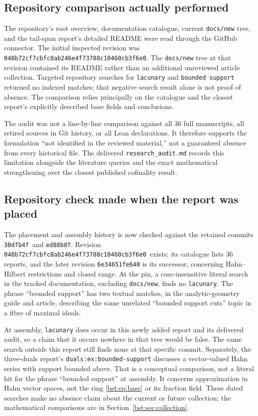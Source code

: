 \documentclass[11pt,letterpaper]{article}
\theoremstyle{definition}
\theoremstyle{remark}
\newcommand{\auditcommit}{\texttt{048b72cf7cbfc8ab246e4f73788c10460cb3f6e0}}
\newcommand{\placecommit}{\texttt{30dfb4f}}
\newcommand{\assemblycommit}{\texttt{ed88b8f}}
\begin{document}
\subsection{Repository comparison actually performed}

The repository's root overview, documentation catalogue, current
\texttt{docs/new} tree, and the tail-span report's detailed README were
read through the GitHub connector. The initial inspected revision was
\auditcommit. The \texttt{docs/new} tree at that revision contained its
README rather than an additional unreviewed article collection. Targeted
repository searches for \texttt{lacunary} and \texttt{bounded support}
returned no indexed matches; that negative search result alone is not
proof of absence. The comparison relies principally on the catalogue and
the closest report's explicitly described base fields and conclusions.

The audit was not a line-by-line comparison against all 36 full manuscripts,
all retired sources in Git history, or all Lean declarations. It therefore
supports the formulation ``not identified in the reviewed material,'' not
a guaranteed absence from every historical file. The delivered
\texttt{research\_audit.md} records this limitation alongside the literature
queries and the exact mathematical strengthening over the closest published
cofinality result.

\subsection{Repository check made when the report was placed}

The placement and assembly history is now checked against the retained
commits \placecommit\ and \assemblycommit. Revision \auditcommit\ exists;
its catalogue lists 36 reports, and the later revision
\texttt{6e34651fe640} is its successor, concerning Hahn--Hilbert restrictions
and closed range. At the pin, a case-insensitive literal search in the
tracked documentation, excluding \texttt{docs/new}, finds no
\texttt{lacunary}. The phrase ``bounded support'' has two textual matches,
in the analytic-geometry guide and article, describing the same unrelated
``bounded support cuts'' topic in a fibre of maximal ideals.

At assembly, \texttt{lacunary} does occur in this newly added report and
its delivered audit, so a claim that it occurs nowhere in that tree would
be false. The same search outside this report still finds none at that
specific commit. Separately, the three-duals report's
\texttt{duals:ex:bounded-support} discusses a vector-valued Hahn series
with support bounded above. That is a conceptual comparison, not a literal
hit for the phrase ``bounded support'' at assembly. It concerns approximation
in Hahn vector spaces, not the ring \eqref{bst:eq:base} or its fraction field.
These dated searches make no absence claim about the current or future
collection; the mathematical comparisons are in Section~\ref{bst:sec:collection}.
\end{document}
